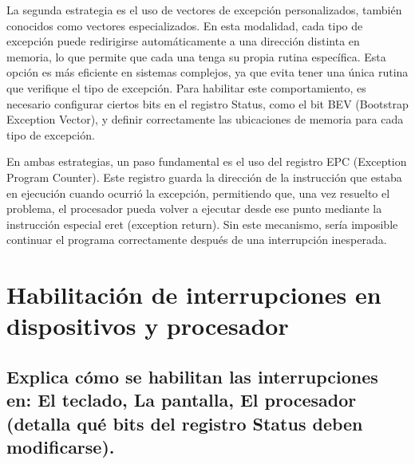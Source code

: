 \documentclass{article}
\begin{document}
La segunda estrategia es el uso de vectores de excepción personalizados, también conocidos como vectores especializados. En esta modalidad, cada tipo de excepción puede redirigirse automáticamente a una dirección distinta en memoria, lo que permite que cada una tenga su propia rutina específica. Esta opción es más eficiente en sistemas complejos, ya que evita tener una única rutina que verifique el tipo de excepción. Para habilitar este comportamiento, es necesario configurar ciertos bits en el registro Status, como el bit BEV (Bootstrap Exception Vector), y definir correctamente las ubicaciones de memoria para cada tipo de excepción.\newline

En ambas estrategias, un paso fundamental es el uso del registro EPC (Exception Program Counter). Este registro guarda la dirección de la instrucción que estaba en ejecución cuando ocurrió la excepción, permitiendo que, una vez resuelto el problema, el procesador pueda volver a ejecutar desde ese punto mediante la instrucción especial eret (exception return). Sin este mecanismo, sería imposible continuar el programa correctamente después de una interrupción inesperada.

\section{Habilitación de interrupciones en dispositivos y procesador}

\subsection{Explica cómo se habilitan las interrupciones en: El teclado, La pantalla, El procesador (detalla qué bits del registro Status deben modificarse). }
\end{document}
